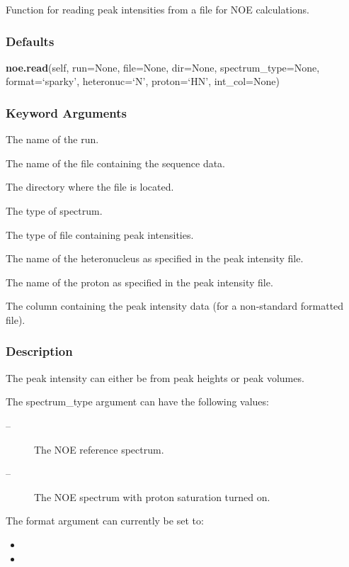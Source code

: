 Function for reading peak intensities from a file for NOE calculations.

\subsubsection{Defaults}

\textsf{\textbf{noe.read}(self, run=None, file=None, dir=None, spectrum\_type=None, format=`sparky', heteronuc=`N', proton=`HN', int\_col=None)}


\subsubsection{Keyword Arguments}


  The name of the run.

  The name of the file containing the sequence  data.

  The directory where the file is located.

  The type of spectrum.

  The type of file containing peak intensities.

  The name of the heteronucleus as specified in the peak intensity file.

  The name of the proton as specified in the peak intensity file.

  The column containing the peak intensity data (for a non-standard formatted file).

\subsubsection{Description}

The peak intensity can either be from peak heights or peak volumes.


The spectrum\_type argument can have the following values:
\begin{description}
\item[    
 --]   The NOE reference spectrum.
\item[    
 --]   The NOE spectrum with proton saturation turned on.
\end{description}


The format argument can currently be set to:
\begin{itemize}
\item[]     
\item[]     
\end{itemize}

